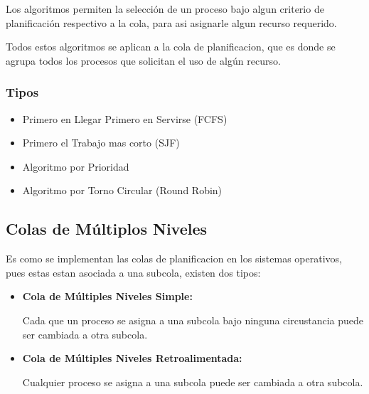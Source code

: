 \documentclass[12pt, fleqn]{report}                             %
\begin{document}
                Los algoritmos permiten la selección de un proceso bajo algun criterio de planificación
                respectivo a la cola, para asi asignarle algun recurso requerido.

                Todos estos algoritmos se aplican a la cola de planificacion, que es donde se agrupa
                todos los procesos que solicitan el uso de algún recurso.

                \subsubsection{Tipos}

                \begin{itemize}
                    \item Primero en Llegar Primero en Servirse (FCFS)
                    \item Primero el Trabajo mas corto (SJF)
                    \item Algoritmo por Prioridad
                    \item Algoritmo por Torno Circular (Round Robin)
                \end{itemize}


            \subsection{Colas de Múltiplos Niveles}

                Es como se implementan las colas de planificacion en los sistemas operativos, pues estas estan
                asociada a una subcola, existen dos tipos:

                \begin{itemize}
                    \item
                        \textbf{Cola de Múltiples Niveles Simple:}

                        Cada que un proceso se asigna a una subcola bajo ninguna circustancia puede ser cambiada
                        a otra subcola.

                    \item
                        \textbf{Cola de Múltiples Niveles Retroalimentada:}

                        Cualquier proceso se asigna a una subcola puede ser cambiada
                        a otra subcola.

                \end{itemize}
\end{document}
